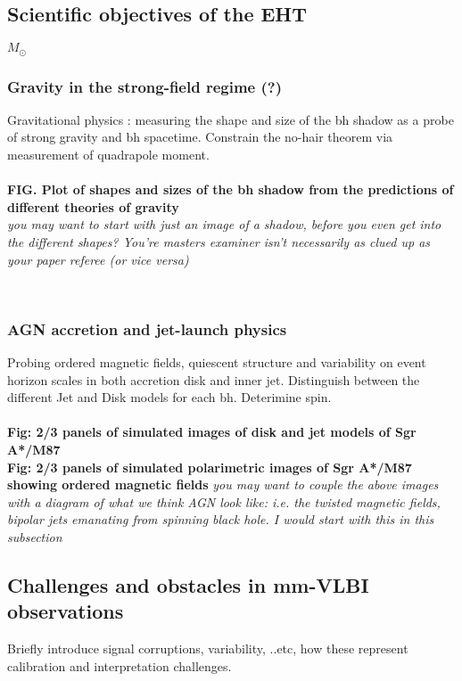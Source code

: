 \documentclass{article}
\begin{document}
\subsection{Scientific objectives of the EHT}


$M_\odot$

\subsubsection{Gravity in the strong-field regime (?)}
Gravitational physics : measuring the shape and size of the bh shadow as a probe of strong gravity and bh spacetime. Constrain the no-hair theorem via measurement of quadrapole moment.\\
~\\
{\bf FIG. Plot of shapes and sizes of the bh shadow from the predictions of different theories of gravity}\\
{\it you may want to start with just an image of a shadow, before you even get into the different shapes? You're masters examiner isn't necessarily as clued up as your paper referee (or vice versa)}

~\\
\subsubsection{AGN accretion and jet-launch physics} 
Probing ordered magnetic fields, quiescent structure and variability on event horizon scales in both accretion disk and inner jet. Distinguish between the different Jet and Disk models for each bh. Deterimine spin.\\
~\\
\textbf{Fig: 2/3 panels of simulated images of disk and jet models of Sgr A*/M87}\\
\textbf{Fig: 2/3 panels of simulated polarimetric images of Sgr A*/M87 showing ordered magnetic fields}
{\it you may want to couple the above images with a diagram of what we think AGN look like: i.e. the twisted magnetic fields, bipolar jets emanating from spinning black hole. I would start with this in this subsection}


\subsection{Challenges and obstacles in mm-VLBI observations}

Briefly introduce signal corruptions, variability, ..etc, how these represent calibration and interpretation challenges.
\end{document}
